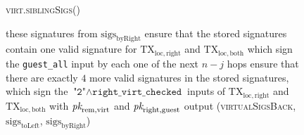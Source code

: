 \begin{figure}[H]
\begin{processbox}{\textsc{virt.siblingSigs}()}
\begin{algorithmic}[1]
      these signatures from $\mathrm{sigs}_{\mathrm{byRight}}$
      \State ensure that the stored signatures contain one valid signature for
      $\mathrm{TX}_{\mathrm{loc}, \mathrm{right}}$ and
      $\mathrm{TX}_{\mathrm{loc}, \mathrm{both}}$ which sign the
      \texttt{guest\_all} input by each one of the next $n-j$ hops
      \State ensure that there are exactly $4$ more valid signatures in the
      stored signatures, which sign the $\texttt{"2"} \wedge
      \texttt{right\_virt\_checked}$ inputs of $\mathrm{TX}_{\mathrm{loc},
      \mathrm{right}}$ and $\mathrm{TX}_{\mathrm{loc}, \mathrm{both}}$ with
      $\textit{pk}_{\mathrm{rem}, \mathrm{virt}}$ and $\textit{pk}_{\mathrm{right},
      \mathrm{guest}}$
      \State output (\textsc{virtualSigsBack},
      $\mathrm{sigs}_{\mathrm{toLeft}}$, $\mathrm{sigs}_{\mathrm{byRight}}$)
    \end{algorithmic}
  \end{processbox}
  \caption{}
  \label{code:virtual-layer:sibling-sigs}
\end{figure}

